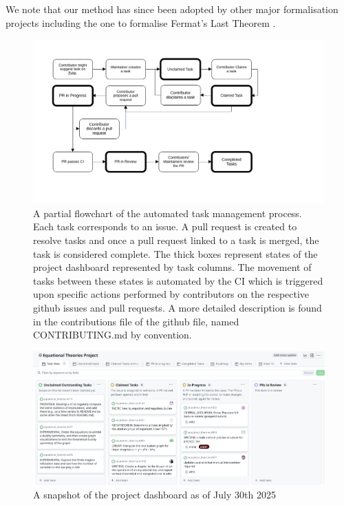 We note that our method has since been adopted by other major formalisation projects including the one to formalise Fermat's Last Theorem \cite{FLT_Lean}.
\begin{figure}[t]
    \centering
    \includegraphics[width=1.0\textwidth]{proj_mgmt_figures/task_flowchart.png}
    \caption{\label{fig:proj_mgmt_flow} A partial flowchart of the automated task management process. Each task corresponds to an issue. A pull request is created to resolve tasks and once a pull request linked to a task is merged, the task is considered complete. The thick boxes represent states of the project dashboard represented by task columns. The movement of tasks between these states is automated by the CI which is triggered upon specific actions performed by contributors on the respective github issues and pull requests. A more detailed description is found in the contributions file of the github file, named CONTRIBUTING.md by convention.}
\end{figure}

\begin{figure}[t]
    \centering
    \includegraphics[width=1.0\textwidth]{proj_mgmt_figures/proj_dash_snapshot.png}
    \caption{\label{fig:proj_dashboard} A snapshot of the project dashboard as of July 30th 2025}
\end{figure}
